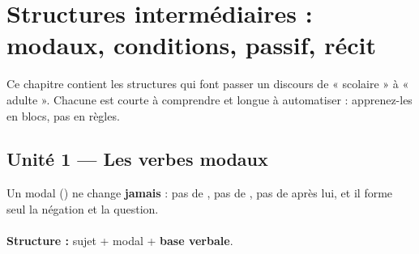 \chapter{Structures intermédiaires : modaux, conditions, passif, récit}

Ce chapitre contient les structures qui font passer un discours de « scolaire » à « adulte ».
Chacune est courte à comprendre et longue à automatiser : apprenez-les en blocs, pas en règles.

\section{Unité 1 --- Les verbes modaux}

\begin{regle}
Un modal () ne change
\textbf{jamais} : pas de , pas de , pas de  après lui, et il forme
seul la négation et la question.\\
 \quad {} \quad {}\\
\textbf{Structure :} sujet + modal + \textbf{base verbale}.
\end{regle}

